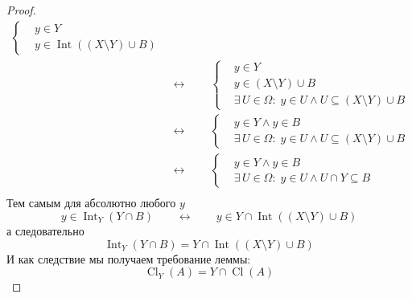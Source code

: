 \documentclass[12pt,a4paper]{article}
\DeclareMathOperator{\Cl}{Cl}
\DeclareMathOperator{\Int}{Int}
\begin{document}
\begin{problem}{20}
\begin{proof}
\begin{align*}
                    \left\{
                        \begin{aligned}
                            &y \in Y\\
                            &y \in \Int((X \setminus Y) \cup B)
                        \end{aligned}
                    \right.\\
                &\longleftrightarrow\qquad
                    \left\{
                        \begin{aligned}
                            &y \in Y\\
                            &y \in (X \setminus Y) \cup B\\
                            &\exists\, U \in \Omega:\; y \in U \wedge U \subseteq (X \setminus Y) \cup B
                        \end{aligned}
                    \right.\\
                &\longleftrightarrow\qquad
                    \left\{
                        \begin{aligned}
                            &y \in Y \wedge y \in B\\
                            &\exists\, U \in \Omega:\; y \in U \wedge U \subseteq (X \setminus Y) \cup B
                        \end{aligned}
                    \right.\\
                &\longleftrightarrow\qquad
                    \left\{
                        \begin{aligned}
                            &y \in Y \wedge y \in B\\
                            &\exists\, U \in \Omega:\; y \in U \wedge U \cap Y \subseteq B
                        \end{aligned}
                    \right.\\
            \end{align*}
            Тем самым для абсолютно любого $y$
            \[y \in \Int_Y(Y \cap B)\qquad \longleftrightarrow\qquad y \in Y \cap \Int((X \setminus Y) \cup B)\]
            а следовательно
            \[\Int_Y(Y \cap B) = Y \cap \Int((X \setminus Y) \cup B)\]
            И как следствие мы получаем требование леммы:
            \[\Cl_Y(A) = Y \cap \Cl(A)\]
        \end{proof}
    \end{problem}
\end{document}
